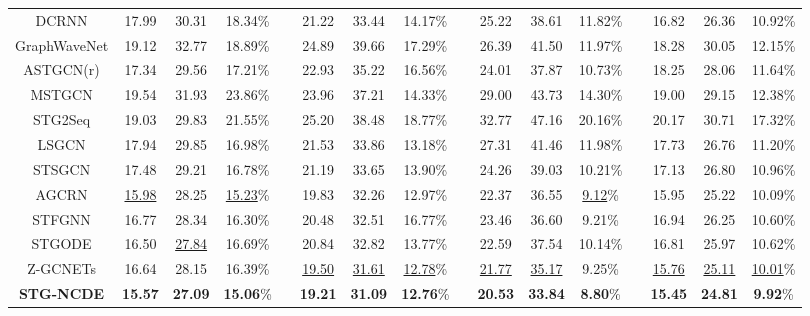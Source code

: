 \documentclass[letterpaper]{article} \usepackage{aaai22}  \usepackage{times}  \usepackage{helvet}  \usepackage{courier}  \usepackage[hyphens]{url}  \usepackage{graphicx} \urlstyle{rm} \def\UrlFont{\rm}  \usepackage{natbib}  \usepackage{caption} \DeclareCaptionStyle{ruled}{labelfont=normalfont,labelsep=colon,strut=off} \frenchspacing  \setlength{\pdfpagewidth}{8.5in}  \setlength{\pdfpageheight}{11in}  \usepackage{stfloats}
\begin{document}
\begin{table*}[t]
\begin{tabular}{c ccc c ccc c ccc c ccc}
        DCRNN                   & 17.99 & 30.31 & 18.34\%       && 21.22 & 33.44 & 14.17\%         && 25.22 & 38.61 & 11.82\%         && 16.82 & 26.36 & 10.92\%         \\ 
        GraphWaveNet            & 19.12 & 32.77 & 18.89\%       && 24.89 & 39.66 & 17.29\%         && 26.39 & 41.50 & 11.97\%         && 18.28 & 30.05 & 12.15\%         \\ 
        ASTGCN(r)               & 17.34 & 29.56 & 17.21\%       && 22.93 & 35.22 & 16.56\%         && 24.01 & 37.87 & 10.73\%         && 18.25 & 28.06 & 11.64\%         \\ 
        MSTGCN                  & 19.54 & 31.93 & 23.86\%       && 23.96 & 37.21 & 14.33\%         && 29.00 & 43.73 & 14.30\%         && 19.00 & 29.15 & 12.38\%         \\       
        STG2Seq                 & 19.03 & 29.83 & 21.55\%       && 25.20 & 38.48 & 18.77\%         && 32.77 & 47.16 & 20.16\%         && 20.17 & 30.71 & 17.32\%         \\ 
        LSGCN                   & 17.94 & 29.85 & 16.98\%       && 21.53 & 33.86 & 13.18\%         && 27.31 & 41.46 & 11.98\%         && 17.73 & 26.76 & 11.20\%         \\       
        STSGCN                  & 17.48 & 29.21 & 16.78\%       && 21.19 & 33.65 & 13.90\%         && 24.26 & 39.03 & 10.21\%         && 17.13 & 26.80 & 10.96\%         \\        
        AGCRN                   & \underline{15.98} & 28.25 & \underline{15.23}\%       && 19.83 & 32.26 & 12.97\%   && 22.37 & 36.55 &  \underline{9.12}\%    && 15.95 & 25.22 & 10.09\%         \\
        STFGNN                  & 16.77 & 28.34 & 16.30\%       && 20.48 & 32.51 & 16.77\%         && 23.46 & 36.60 &  9.21\%         && 16.94 & 26.25 & 10.60\%         \\        
        STGODE                   & 16.50 & \underline{27.84} & 16.69\%       && 20.84 & 32.82 & 13.77\%         && 22.59 & 37.54 & 10.14\% && 16.81 & 25.97 & 10.62\%         \\
        Z-GCNETs                & 16.64 & 28.15 & 16.39\%       && \underline{19.50} & \underline{31.61} & \underline{12.78}\%        && \underline{21.77} & \underline{35.17} & 9.25\%   && \underline{15.76} & \underline{25.11} & \underline{10.01}\% \\
        \hline
        \textbf{STG-NCDE}       & \textbf{15.57} & \textbf{27.09}    &   \textbf{15.06}\% && \textbf{19.21}    & \textbf{31.09}    &  \textbf{12.76}\%   && \textbf{20.53} & \textbf{33.84} & \textbf{8.80}\%    && \textbf{15.45} & \textbf{24.81} &  \textbf{9.92}\% \\

\end{tabular}
\end{table*}
\end{document}
